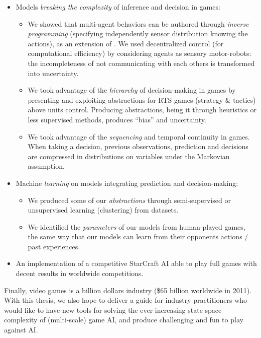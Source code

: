 \begin{itemize}
    \item  Models \textit{breaking the complexity} of inference and decision in games:
    \begin{itemize}
        \item We showed that multi-agent behaviors can be authored through \textit{inverse programming} (specifying independently sensor distribution knowing the actions), as an extension of \citep{theseRonan}. We used decentralized control (for computational efficiency) by considering agents as sensory motor-robots: the incompleteness of not communicating with each others is transformed into uncertainty.
        \item We took advantage of the \textit{hierarchy} of decision-making in games by presenting and exploiting abstractions for RTS games (strategy \& tactics) above units control. Producing abstractions, being it through heuristics or less supervised methods, produces ``bias'' and uncertainty.
        \item We took advantage of the \textit{sequencing} and temporal continuity in games. When taking a decision, previous observations, prediction and decisions are compressed in distributions on variables under the Markovian assumption. %
    \end{itemize}

    \item Machine \textit{learning} on models integrating prediction and decision-making:
    \begin{itemize}
        \item We produced some of our \textit{abstractions} through semi-supervised or unsupervised learning (clustering) from datasets.
        \item We identified the \textit{parameters} of our models from human-played games, the same way that our models can learn from their opponents actions / past experiences.
    \end{itemize}
    \item An implementation of a competitive StarCraft AI able to play full games with decent results in worldwide competitions.

\end{itemize}

Finally, video games is a billion dollars industry (\$65 billion worldwide in 2011). With this thesis, we also hope to deliver a guide for industry practitioners who would like to have new tools for solving the ever increasing state space complexity of (multi-scale) game AI, and produce challenging and fun to play against AI. %

